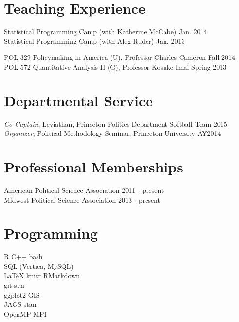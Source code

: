 \documentclass[]{deedy-resume-openfont}
\begin{document}
\section{Teaching Experience}
Statistical Programming Camp (with Katherine McCabe) \hfill Jan. 2014\\
Statistical Programming Camp (with Alex Ruder) \hfill Jan. 2013\\\vspace{2mm}

POL 329 Policymaking in America (U), Professor Charles Cameron \hfill Fall 2014\\
POL 572 Quantitative Analysis II (G), Professor Kosuke Imai \hfill Spring 2013\\
\sectionsep

\section{Departmental Service}
{\it Co-Captain}, Leviathan, Princeton Politics Department Softball Team \hfill 2015\\
{\it Organizer}, Political Methodology Seminar, Princeton University \hfill AY2014\\
\sectionsep

\section{Professional Memberships}
American Political Science Association \hfill 2011 - present\\
Midwest Political Science Association \hfill 2013 - present\\
\sectionsep


\section{Programming}
	\quad R \textbullet{} C++ \textbullet{} bash \\
	\quad SQL (Vertica, MySQL)\\
	\quad \LaTeX \textbullet{} knitr \textbullet{} RMarkdown\\
	\quad git\textbullet{} svn\\
	\quad ggplot2\textbullet{} GIS\\
	\quad JAGS\textbullet{} stan\\
	\quad OpenMP\textbullet{} MPI
\sectionsep
\end{document}
